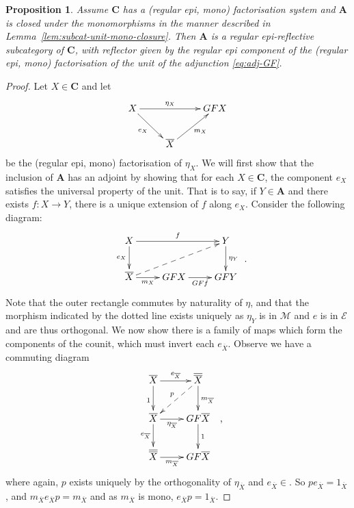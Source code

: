 \documentclass[11pt, a4paper, twoside,leqno]{amsart}
\newcommand{\cat}[1]{\mathbf{#1}}
\newcommand{\cd}[2][]{\vcenter{\hbox{\xymatrix#1{#2}}}}
\numberwithin{equation}{section}
\theoremstyle{plain}
\newtheorem{Prop}[Thm]{Proposition}
\theoremstyle{definition}
\begin{document}
\begin{Prop}
  \label{prop:orthog-reflective-subcat}
  Assume \(\cat{C}\) has a (regular epi, mono) factorisation system
  and \(\cat{A}\) is closed under the monomorphisms 
  in the manner described in
  Lemma~\ref{lem:subcat-unit-mono-closure}.
  Then \(\cat{A}\) is a regular epi-reflective
  subcategory of \(\cat{C}\), with reflector given by the regular epi
  component of the (regular epi, mono) factorisation of the
  unit of the adjunction \eqref{eq:adj-GF}.
\end{Prop}

\begin{proof}
  Let \(X\in \cat{C}\) and let
  \begin{equation}
    \label{eq:27}
    \cd{
      {X} \ar[rr]^-{\eta_{X}}
      \ar[dr]_-{e_{X}} & &
      {GFX}  \\
      &
      \ar[ur]_-{m_{X}}
      {\overline{X}}
    }
  \end{equation}
  be the (regular epi, mono)
  factorisation of \(\eta_{X}\).   We will first show that the inclusion of
  \(\cat{A}\) has an adjoint by showing that for each \(X \in
  \cat{C}\), the component \(e_{X}\) satisfies the universal property
  of the unit. That is to say, if \(Y\in \cat{A}\) and there exists \(f \colon X
  \rightarrow Y\), there is a unique extension of \(f\) along \(e_{X}\).
  Consider the following diagram:
  \begin{equation}
    \label{eq:28}
    \cd{
      {X} \ar[rr]^-{f}
      \ar[d]_-{e_{X}} & &
      \ar[d]^-{\eta_{Y}}
      {Y}  \\
      {\overline{X}} \ar[r]_-{m_{X}}
      \ar@{-->}[urr]^-{}
      &
      {GFX} \ar[r]_-{GFf} & {GFY}
    }\rlap{ .}
  \end{equation}
  Note that the outer rectangle commutes by naturality of \(\eta\),
  and that the morphism indicated by the dotted line exists uniquely
  as
  \(\eta_{Y}\) is in \(\mathscr{M}
  \) and \(e\) is in \(\mathscr{E}
  \) and are thus orthogonal. We now show there is a family of maps
  which form the components of the counit, which must invert each
  \(e_{\overline{X}}\). Observe we have a commuting diagram
  \begin{equation}
    \label{eq:32}
    \cd{
      {\overline{X}} \ar[r]^-{e_{\overline{X}}} \ar[d]_{1} &
      {\overline{\overline{X}}} \ar[d]^{m_{\overline{X}}} \ar@{-->}[dl]_-{p} \\
      {\overline{X}} \ar[r]_-{\eta_{\overline{X}}} \ar[d]_-{e_{\overline{X}}} &
      {GF\overline{X}} \ar[d]^-{1}\\
      {\overline{\overline{X}}} \ar[r]_-{m_{\overline{X}}} & {GF\overline{X}}
    }\rlap{ ,}
  \end{equation}
  where again, \(p\) exists uniquely by the orthogonality of \(\eta_{\overline{X}}
  \) and \(e_{\overline{X}}\in 
  \). So
  \(p e_{\overline{X}} = 1_{\overline{X}}\), and
  \(m_{\overline{X}} e_{\overline{X}} p = m_{\overline{X}}\) and as \(m_{\overline{X}}\) is mono,
  \(e_{\overline{X}} p = 
  1_{\overline{X}}\). 


\end{proof}
\end{document}
